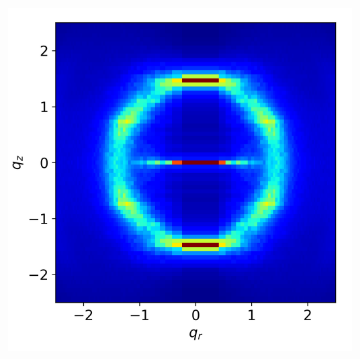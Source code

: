 \documentclass{article}
\begin{document}
\begin{figure}
\begin{subfigure}{0.3\linewidth}
        \caption{}~\label{fig:raw_waxs}
  \end{subfigure}
  \begin{subfigure}{0.3\linewidth}
        \centering
        \includegraphics[width=\linewidth]{layered_rzplot.png}
        \caption{}~\label{fig:rz_layered}
  \end{subfigure}
  \begin{subfigure}{0.0544\linewidth}
        \centering
        \vspace{-4.00em}

\end{subfigure}
\end{figure}
\end{document}
